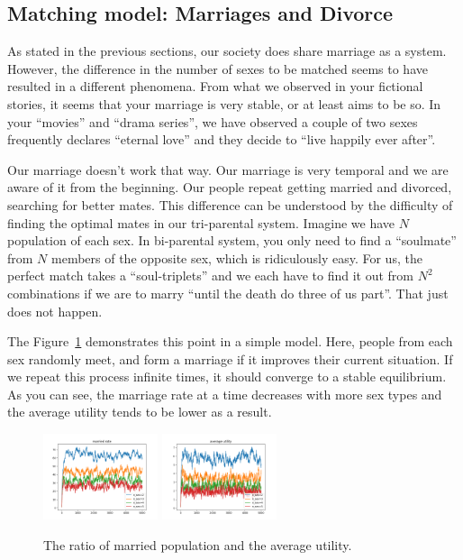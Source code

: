 \documentclass{report}
\begin{document}
\subsection*{Matching model: Marriages and Divorce}

As stated in the previous sections, our society does share marriage as a system. However, the difference in the number of sexes to be matched seems to have resulted in a different phenomena. From what we observed in your fictional stories, it seems that your marriage is very stable, or at least aims to be so. In your ``movies'' and ``drama series'', we have observed a couple of two sexes frequently declares ``eternal love'' and they decide to ``live happily ever after''. 

Our marriage doesn't work that way. Our marriage is very temporal and we are aware of it from the beginning. Our people repeat getting married and divorced, searching for better mates. This difference can be understood by the difficulty of finding the optimal mates in our tri-parental system. Imagine we have $N$ population of each sex. In bi-parental system, you only need to find a ``soulmate'' from $N$ members of the opposite sex, which is ridiculously easy. For us, the perfect match takes a ``soul-triplets'' and we each have to find it out from $N^2$ combinations if we are to marry ``until the death do three of us part''. That just does not happen.

The Figure~\ref{fig:married_rate} demonstrates this point in a simple model. Here, people from each sex randomly meet, and form a marriage if it improves their current situation. If we repeat this process infinite times, it should converge to a stable equilibrium. As you can see, the marriage rate at a time decreases with more sex types and the average utility tends to be lower as a result.
\begin{figure}[htb!]
    \centering
    \includegraphics[width = 0.3\textwidth]{hajimeFigs/married_rate_n.png}
    \includegraphics[width = 0.3\textwidth]{hajimeFigs/average_utility_n.png}
    \caption{The ratio of married population and the average utility.}
    \label{fig:married_rate}
\end{figure}
\end{document}
